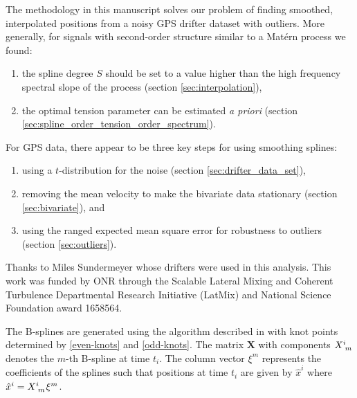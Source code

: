 \documentclass{ametsoc}
\begin{document}
The methodology in this manuscript solves our problem of finding smoothed, interpolated positions from a noisy GPS drifter dataset with outliers. More generally, for signals with second-order structure similar to a Mat\'ern process we found:
\begin{enumerate}
\item the spline degree $S$ should be set to a value higher than the high frequency spectral slope of the process (section \ref{sec:interpolation}),
\item the optimal tension parameter can be estimated \emph{a priori} (section \ref{sec:spline_order_tension_order_spectrum}).
\end{enumerate}
For GPS data, there appear to be three key steps for using smoothing splines:
\begin{enumerate}
    \item using a $t$-distribution for the noise (section \ref{sec:drifter_data_set}),
    \item removing the mean velocity to make the bivariate data stationary (section \ref{sec:bivariate}), and
    \item using the ranged expected mean square error for robustness to outliers (section \ref{sec:outliers}).
\end{enumerate}

\acknowledgments
Thanks to Miles Sundermeyer whose drifters were used in this analysis. This work was funded by ONR through the Scalable Lateral Mixing and Coherent Turbulence Departmental Research Initiative (LatMix) and National Science Foundation award 1658564.

%
\appendix[A]
%

\label{appendixA:numerical_implementation}

The B-splines are generated using the algorithm described in \citet{deboor1978-book} with knot points determined by  \eqref{even-knots} and \eqref{odd-knots}. The matrix $\mathbf{X}$ with components $X\indices{^i_m}$ denotes the $m$-th B-spline at time $t_i$. The column vector $\xi^m$ represents the coefficients of the splines such that positions at time $t_i$ are given by $\hat{x}^i$ where $\hat{x}^i =  X\indices{^i_m} \xi^m$.
\end{document}
